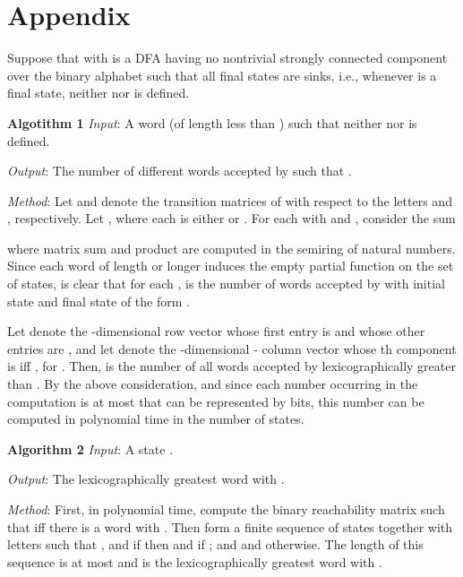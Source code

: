 \documentclass[copyright]{eptcs}
\begin{document}
\section*{Appendix}




Suppose that  with 
is a DFA having no nontrivial strongly connected component over 
the binary alphabet  such that all final states 
are sinks, i.e., whenever  is a final state, neither  nor  
is defined.


{\bf Algotithm 1} {\em Input}: A word  (of length less than ) such that 
neither  nor  is defined. 

{\em Output}: The number of different words  accepted by
 such that .

{\em Method}: 
Let  and  denote the  transition
matrices of  with respect to the letters  and ,
respectively. 
Let , where each  is either  or .
For each  with  and ,
consider the sum

where matrix sum and product are computed in the semiring of natural numbers. 
Since each word of length  or longer induces the 
empty partial function on the set of states, is clear that for each , 
 is the number of words accepted by  with 
initial state  and final state  of the form 
. 

Let  denote the -dimensional row vector whose first entry is 
and whose other entries are , and let  denote the -dimensional 
- column vector whose th component is  iff ,
for .  
Then,  is the number of all words 
accepted by  lexicographically greater than .
By the above consideration, and since each number 
occurring in the computation is at most  that 
can be represented by  bits, this number can be computed
in polynomial time in the number  of states.



{\bf Algorithm 2}
{\em Input}:  A state .

{\em Output}: The lexicographically greatest word  with .

{\em Method}: First, in polynomial time, compute the  
binary reachability matrix  such that  iff there is a word
 with . Then form a finite sequence of states 
  together with letters 
such that , and if  then 
 and  if ; and  
and  otherwise. 
The length  of this sequence is at most  
and  is the lexicographically greatest word  
with .
\end{document}
